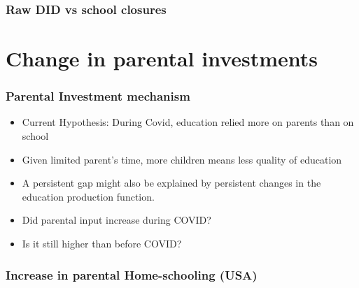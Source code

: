 \documentclass{beamer}
\begin{document}
\begin{frame}
    \label{update_scott}
    \frametitle{Raw DID vs school closures}
        {
    }
\end{frame}

\section{Change in parental investments}


\begin{frame}
    \frametitle{Parental Investment mechanism}
    \begin{itemize}
        \item Current Hypothesis: During Covid, education relied more on parents than on school
        \item Given limited parent's time, more children means less quality of education
        \item A persistent gap might also be explained by persistent changes in the education production function. 
        \item Did parental input increase during COVID? 
        \item Is it still higher than before COVID?
    \end{itemize}
\end{frame}

\begin{frame}
    \label{update_scott}
    \frametitle{Increase in parental Home-schooling (USA)}
        {
    }
\end{frame}
\end{document}

